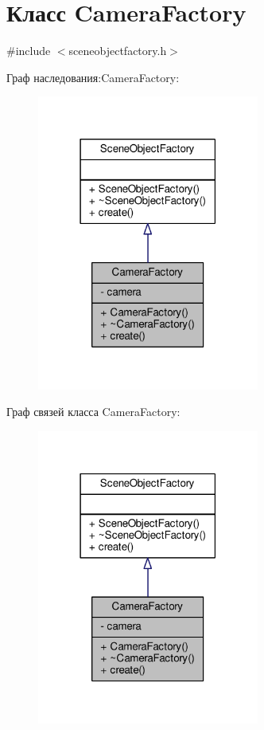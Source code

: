 \hypertarget{class_camera_factory}{}\section{Класс Camera\+Factory}
\label{class_camera_factory}


{\ttfamily \#include $<$sceneobjectfactory.\+h$>$}



Граф наследования\+:Camera\+Factory\+:
\nopagebreak
\begin{figure}[H]
\begin{center}
\leavevmode
\includegraphics[width=207pt]{dc/db7/class_camera_factory__inherit__graph}
\end{center}
\end{figure}


Граф связей класса Camera\+Factory\+:
\nopagebreak
\begin{figure}[H]
\begin{center}
\leavevmode
\includegraphics[width=207pt]{da/d5f/class_camera_factory__coll__graph}
\end{center}
\end{figure}
